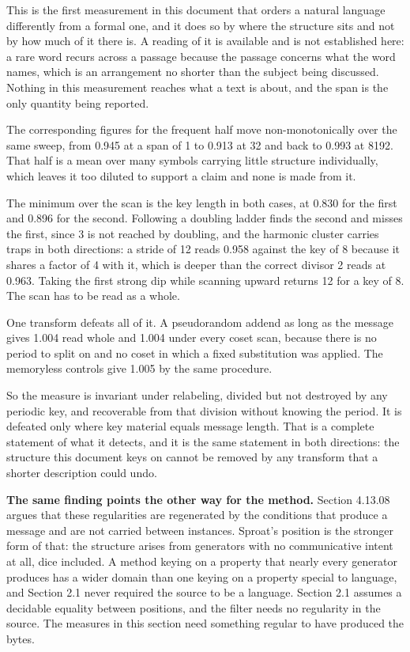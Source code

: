 This is the first measurement in this document that orders a natural language differently from a formal one, and it does so by where the structure sits and not by how much of it there is. A reading of it is available and is not established here: a rare word recurs across a passage because the passage concerns what the word names, which is an arrangement no shorter than the subject being discussed. Nothing in this measurement reaches what a text is about, and the span is the only quantity being reported.

The corresponding figures for the frequent half move non-monotonically over the same sweep, from 0.945 at a span of 1 to 0.913 at 32 and back to 0.993 at 8192. That half is a mean over many symbols carrying little structure individually, which leaves it too diluted to support a claim and none is made from it.

The minimum over the scan is the key length in both cases, at 0.830 for the first and 0.896 for the second. Following a doubling ladder finds the second and misses the first, since 3 is not reached by doubling, and the harmonic cluster carries traps in both directions: a stride of 12 reads 0.958 against the key of 8 because it shares a factor of 4 with it, which is deeper than the correct divisor 2 reads at 0.963. Taking the first strong dip while scanning upward returns 12 for a key of 8. The scan has to be read as a whole.

One transform defeats all of it. A pseudorandom addend as long as the message gives 1.004 read whole and 1.004 under every coset scan, because there is no period to split on and no coset in which a fixed substitution was applied. The memoryless controls give 1.005 by the same procedure.

So the measure is invariant under relabeling, divided but not destroyed by any periodic key, and recoverable from that division without knowing the period. It is defeated only where key material equals message length. That is a complete statement of what it detects, and it is the same statement in both directions: the structure this document keys on cannot be removed by any transform that a shorter description could undo.

\noindent\textbf{The same finding points the other way for the method.} Section 4.13.08 argues that these regularities are regenerated by the conditions that produce a message and are not carried between instances. Sproat's position is the stronger form of that: the structure arises from generators with no communicative intent at all, dice included. A method keying on a property that nearly every generator produces has a wider domain than one keying on a property special to language, and Section 2.1 never required the source to be a language. Section 2.1 assumes a decidable equality between positions, and the filter needs no regularity in the source. The measures in this section need something regular to have produced the bytes.

